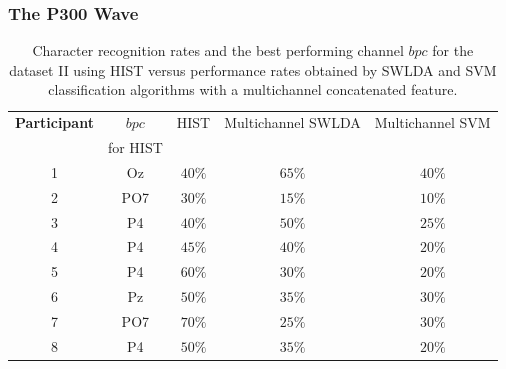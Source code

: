 \documentclass[aspectratio=169]{beamer}
\begin{document}
\begin{frame}
\frametitle{The P300 Wave}
\begin{center}
\begin{table}[h!]
\caption[Dataset II - Comparisons of Character Recognition Rates]{Character recognition rates and the best performing channel $bpc$ for the  dataset II  using HIST versus performance rates obtained by SWLDA and SVM classification algorithms with a multichannel concatenated feature.}
\centering
\begin{tabular}{c|cc|c|c}
\toprule
\textbf{Participant}	&  $bpc$ 	&  HIST & Multichannel SWLDA & Multichannel SVM  \\
                                    &  for HIST        &           &                                       &   \\
\midrule
1     &     Oz   &     $40\%$  &     $65\%$  &     $40\%$ \\
2     &     PO7   &     $30\%$ &   $15\%$  &     $10\%$ \\
3     &     P4   &     $40\%$ &     $50\%$  &     $25\%$ \\
4     &     P4   &     $45\%$ &     $40\%$  &     $20\%$ \\
5     &     P4   &      $60\%$ &    $30\%$  &     $20\%$ \\
6     &     Pz   &      $50\%$ &    $35\%$  &     $30\%$ \\
7     &     PO7   &      $70\%$ &  $25\%$  &     $30\%$ \\
8     &     P4   &      $50\%$ &    $35\%$  &     $20\%$ \\

\end{tabular}
\label{tab:resultsownswlda}
\end{table}
\end{center}
\end{frame} 
\end{document}
